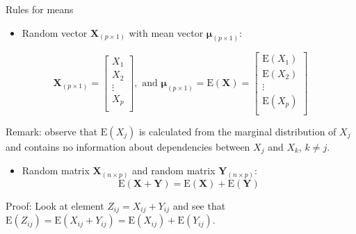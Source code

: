 \documentclass[ignorenonframetext,]{beamer}
\providecommand{\tightlist}{%
  \setlength{\itemsep}{0pt}\setlength{\parskip}{0pt}}
\begin{document}
\begin{frame}

\begin{block}{Rules for means}

\begin{itemize}
\tightlist
\item
  Random vector \(\mathbf{X}_{(p\times 1)}\) with mean vector
  \(\mathbf{\mu}_{(p\times 1)}\):
\end{itemize}

\[\mathbf{X}_{(p\times 1)}=\left[ \begin{array}{c}X_1\\ X_2\\ \vdots\\ X_p\\ \end{array}\right], \text{ and }\mathbf{\mu}_{(p \times 1)}=\text{E}(\mathbf{X})=\left[ \begin{array}{c}\text{E}(X_1)\\ \text{E}(X_2)\\ \vdots\\ \text{E}(X_p)\\ \end{array}\right]\]

Remark: observe that \(\text{E}(X_j)\) is calculated from the marginal
distribution of \(X_j\) and contains no information about dependencies
between \(X_{j}\) and \(X_k\), \(k\neq j\).

\begin{itemize}
\tightlist
\item
  Random matrix \(\mathbf{X}_{(n\times p)}\) and random matrix
  \(\mathbf{Y}_{(n\times p)}\):
  \[\text{E}(\mathbf{X}+\mathbf{Y})=\text{E}(\mathbf{X})+\text{E}(\mathbf{Y})\]
\end{itemize}

Proof: Look at element \(Z_{ij}=X_{ij}+Y_{ij}\) and see that
\(\text{E}(Z_{ij})=\text{E}(X_{ij}+Y_{ij})=\text{E}(X_{ij})+\text{E}(Y_{ij})\).

\end{block}

\end{frame}
\end{document}
